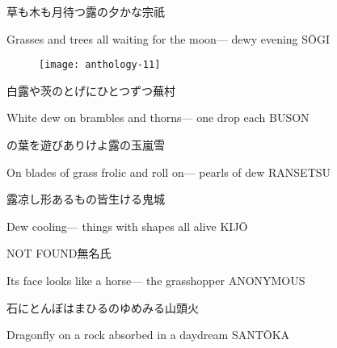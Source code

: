 \begin{haiku}
    {\FH 草も木も月待つ露の夕かな}\hfill{\FH 宗祇}

    \vin{} Grasses and trees all
    \vin{} \vin{} waiting for the moon---
    \vin{} \vin{} \vin{} dewy evening \hspace{\fill} S\={O}GI
\end{haiku}

\begin{figure}
    \texttt{[image: anthology-11]}
\end{figure}

\begin{haiku}
    {\FH 白露や茨のとげにひとつずつ}\hfill{\FH 蕪村}

    \vin{} White dew
    \vin{} \vin{} on brambles and thorns---
    \vin{} \vin{} \vin{} one drop each \hspace{\fill} BUSON
\end{haiku}

\begin{haiku}
    {\FH {}の葉を遊びありけよ露の玉}\hfill{\FH 嵐雪}

    \vin{} On blades of grass
    \vin{} \vin{} frolic and roll on---
    \vin{} \vin{} \vin{} pearls of dew \hspace{\fill} RANSETSU
\end{haiku}

\begin{haiku}
    {\FH 露凉し形あるもの皆生ける}\hfill{\FH 鬼城}

    \vin{} Dew cooling---
    \vin{} \vin{} things with shapes
    \vin{} \vin{} \vin{} all alive \hspace{\fill} KIJ\={O}
\end{haiku}

\begin{haiku}
    {NOT FOUND}\hfill{\FH 無名氏}

    \vin{} Its face
    \vin{} \vin{} looks like a horse---
    \vin{} \vin{} \vin{} the grasshopper \hspace{\fill} ANONYMOUS
\end{haiku}

\begin{haiku}
    {\FH 石にとんぼはまひるのゆめみる}\hfill{\FH 山頭火}

    \vin{} Dragonfly on a rock
    \vin{} \vin{} absorbed in
    \vin{} \vin{} \vin{} a daydream \hspace{\fill} SANT\={O}KA
\end{haiku}

